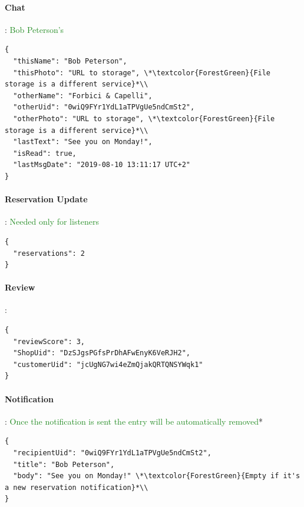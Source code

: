 \paragraph*{Chat}: \textcolor{ForestGreen}{Bob Peterson's}
\label{Par:Chat}
\begin{lstlisting}
{
  "thisName": "Bob Peterson",
  "thisPhoto": "URL to storage", \*\textcolor{ForestGreen}{File storage is a different service}*\\
  "otherName": "Forbici & Capelli",
  "otherUid": "0wiQ9FYr1YdL1aTPVgUe5ndCmSt2",
  "otherPhoto": "URL to storage", \*\textcolor{ForestGreen}{File storage is a different service}*\\
  "lastText": "See you on Monday!",
  "isRead": true,
  "lastMsgDate": "2019-08-10 13:11:17 UTC+2"
}
\end{lstlisting}
\paragraph*{Reservation Update}: \textcolor{ForestGreen}{Needed only for listeners}
\label{Par:ReservationUpdate}
\begin{lstlisting}
{
  "reservations": 2
}
\end{lstlisting}
\paragraph*{Review}:
\label{Par:Review}
\begin{lstlisting}
{
  "reviewScore": 3,
  "ShopUid": "DzSJgsPGfsPrDhAFwEnyK6VeRJH2",
  "customerUid": "jcUgNG7wi4eZmQjakQRTQNSYWqk1"
}
\end{lstlisting}
\paragraph*{Notification}: \*\textcolor{ForestGreen}{Once the notification is sent the entry will be automatically removed}*\\
\label{Par:Notification}
\begin{lstlisting}
{
  "recipientUid": "0wiQ9FYr1YdL1aTPVgUe5ndCmSt2",
  "title": "Bob Peterson", 
  "body": "See you on Monday!" \*\textcolor{ForestGreen}{Empty if it's a new reservation notification}*\\
}
\end{lstlisting}
\clearpage
